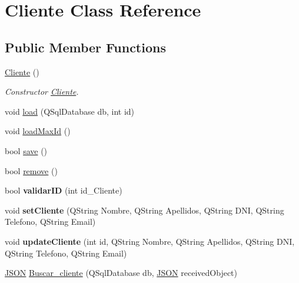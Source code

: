 \hypertarget{classCliente}{}\section{Cliente Class Reference}
\label{classCliente}
\subsection*{Public Member Functions}
\begin{DoxyCompactItemize}
\item 
\mbox{\label{classCliente_ab6a372f412692c12c4be4427b00a3f6e}} 
\mbox{\hyperlink{classCliente_ab6a372f412692c12c4be4427b00a3f6e}{Cliente}} ()
\begin{DoxyCompactList}\small\item\em Constructor \mbox{\hyperlink{classCliente}{Cliente}}. \end{DoxyCompactList}\item 
void \mbox{\hyperlink{classCliente_a2fffa29c5f9c5789b4ea383e0a880bb3}{load}} (Q\+Sql\+Database db, int id)
\item 
void \mbox{\hyperlink{classCliente_a00ab8014b69d2a87746dc1a62d26553a}{load\+Max\+Id}} ()
\item 
bool \mbox{\hyperlink{classCliente_a7c66dee805434f57fa5fa1322fc99312}{save}} ()
\item 
bool \mbox{\hyperlink{classCliente_a8f80581958278a04ead3224e5c840178}{remove}} ()
\item 
\mbox{\label{classCliente_adc3563e3abff2a043eac00801153f3bc}} 
bool {\bfseries validar\+ID} (int id\+\_\+\+Cliente)
\item 
\mbox{\label{classCliente_af54d252995a415d26d1f0ab2137c5a2b}} 
void {\bfseries set\+Cliente} (Q\+String Nombre, Q\+String Apellidos, Q\+String D\+NI, Q\+String Telefono, Q\+String Email)
\item 
\mbox{\label{classCliente_a2d83adac4ca30293f35f61442222437b}} 
void {\bfseries update\+Cliente} (int id, Q\+String Nombre, Q\+String Apellidos, Q\+String D\+NI, Q\+String Telefono, Q\+String Email)
\item 
\mbox{\hyperlink{classnlohmann_1_1basic__json}{J\+S\+ON}} \mbox{\hyperlink{classCliente_ac448f4e423f0e60d706e5e20e88212a9}{Buscar\+\_\+cliente}} (Q\+Sql\+Database db, \mbox{\hyperlink{classnlohmann_1_1basic__json}{J\+S\+ON}} received\+Object)

\end{DoxyCompactItemize}
